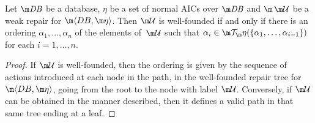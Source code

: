 \begin{proposition}
  \label{prop:wf}
  Let $\db$ be a database, $\eta$ be a set of normal AICs over $\db$ and $\spaceUU$ be a weak repair for $\fulldb$.
  Then $\UU$ is well-founded if and only if there is an ordering $\alpha_1,\ldots,\alpha_n$ of the elements of\, $\UU$ such that $\alpha_i\in\Op(\{\alpha_1,\ldots,\alpha_{i-1}\})$ for each $i=1,\ldots,n$.
\end{proposition}
\begin{proof}
  If $\UU$ is well-founded, then the ordering is given by the sequence of actions introduced at each node in the path, in the well-founded repair tree for $\fulldb$, going from the root to the node with label $\UU$.
  Conversely, if $\UU$ can be obtained in the manner described, then it defines a valid path in that same tree ending at a leaf.
\end{proof}



